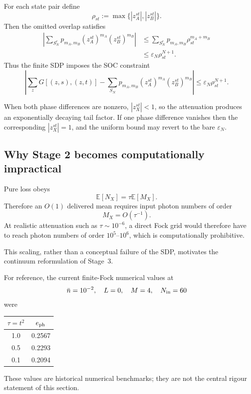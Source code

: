 \documentclass[11pt]{article}
\theoremstyle{remark}
\begin{document}
For each state pair define
\[
    \rho_{st}
    :=
    \max\{|z_A^{st}|,|z_B^{st}|\}.
\]
Then the omitted overlap satisfies
\begin{align}
    \left|
      \sum_{S_N^c}
      p_{m_A,m_B}
      (z_A^{st})^{m_A}(z_B^{st})^{m_B}
    \right|
    &\le
    \sum_{S_N^c}
      p_{m_A,m_B}
      \rho_{st}^{m_A+m_B}
    \nonumber\\
    &\le
    \varepsilon_N\rho_{st}^{N+1}.
    \label{eq:stage2-decaying-tail}
\end{align}
Thus the finite SDP imposes the SOC constraint
\begin{equation}
    \left|
      \sum_zG[(z,s),(z,t)]
      -
      \sum_{S_N}
      p_{m_A,m_B}
      (z_A^{st})^{m_A}(z_B^{st})^{m_B}
    \right|
    \le
    \varepsilon_N\rho_{st}^{N+1}.
    \label{eq:stage2-truncated-soc}
\end{equation}

When both phase differences are nonzero,
\(|z_X^{st}|<1\), so the attenuation produces an exponentially decaying tail
factor.  If one phase difference vanishes then the corresponding
\(|z_X^{st}|=1\), and the uniform bound may revert to the bare
\(\varepsilon_N\).

\subsection{Why Stage 2 becomes computationally impractical}

Pure loss obeys
\[
    \mathbb E[N_X]=\tau\mathbb E[M_X].
\]
Therefore an \(O(1)\) delivered mean requires input photon numbers of order
\[
    M_X=O(\tau^{-1}).
\]
At realistic attenuation such as \(\tau\sim10^{-6}\), a direct Fock grid
would therefore have to reach photon numbers of order \(10^5\)--\(10^6\),
which is computationally prohibitive.

This scaling, rather than a conceptual failure of the SDP, motivates the
continuum reformulation of Stage~3.

For reference, the current finite-Fock numerical values at
\[
    \bar n=10^{-2},\quad L=0,\quad M=4,\quad N_{\rm in}=60
\]
were
\begin{center}
\begin{tabular}{cc}
\toprule
\(\tau=t^2\) & \(e_{\rm ph}\) \\
\midrule
1.0 & 0.2567 \\
0.5 & 0.2293 \\
0.1 & 0.2094 \\
\bottomrule
\end{tabular}
\end{center}
These values are historical numerical benchmarks; they are not the central
rigour statement of this section.
\end{document}
